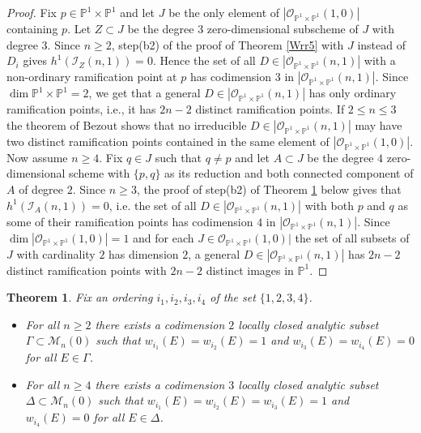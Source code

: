 \documentclass[
  a4paper, 
  reqno, 
  oneside, 
  11pt
]{amsart}
\theoremstyle{plain}	%
\newtheorem{theorem}{Theorem} %
\theoremstyle{mydef} %
\theoremstyle{remark}
\theoremstyle{definition}
\theoremstyle{remark}
\begin{document}
\begin{proof}
Fix $p\in \mathbb P^1\times \mathbb P^1$ and let $J$ be the only element of  $|\mathcal O_{\mathbb P^1\times \mathbb P^1}(1,0)|$ containing $p$. Let $Z\subset J$ be the degree $3$ zero-dimensional subscheme of $J$ with degree $3$. Since $n\ge 2$,  step(b2) of the proof of Theorem \ref{Wrr5} with $J$ instead of $D_i$ gives $h^1(\mathcal I_Z(n,1)) =0$. Hence the set of all $D\in |\mathcal O_{\mathbb P^1\times \mathbb P^1}(n,1)|$ with a non-ordinary ramification point at $p$ has codimension $3$ in $|\mathcal O_{\mathbb P^1\times \mathbb P^1}(n,1)|$. Since $\dim \mathbb P^1\times \mathbb P^1 =2$, we get that a general $D\in |\mathcal O_{\mathbb P^1\times \mathbb P^1}(n,1)|$  has only ordinary ramification points, i.e., it has $2n-2$ distinct ramification points. If $2\le n\le 3$ the theorem of Bezout shows that no irreducible $D\in |\mathcal O_{\mathbb P^1\times \mathbb P^1}(n,1)|$ may have two distinct ramification points contained in the same element of  $|\mathcal O_{\mathbb P^1\times \mathbb P^1}(1,0)|$. Now assume $n\ge 4$. Fix $q\in J$ such that $q\ne p$ and let $A\subset J$ be the degree $4$ zero-dimensional scheme with $\{p,q\}$ as its reduction and both connected component of $A$ of degree $2$. Since $n\ge 3$,
the proof of step(b2) of Theorem \ref{Wrr7} below gives that $h^1(\mathcal I_A(n,1)) =0$, i.e. the set of all  $D\in |\mathcal O_{\mathbb P^1\times \mathbb P^1}(n,1)|$ with both $p$ and $q$ as some of their ramification points has codimension $4$ in  $|\mathcal O_{\mathbb P^1\times \mathbb P^1}(n,1)|$. Since $\dim|\mathcal O_{\mathbb P^1\times \mathbb P^1}(1,0)|=1$ and for each $J\in \mathcal O_{\mathbb P^1\times \mathbb P^1}(1,0)|$ the set of all subsets of $J$ with cardinality $2$ has dimension $2$, a general $D\in |\mathcal O_{\mathbb P^1\times \mathbb P^1}(n,1)|$ has $2n-2$
distinct ramification points with $2n-2$ distinct images in $\mathbb P^1$.
\end{proof}


\begin{theorem}\label{Wrr7}
Fix an ordering $i_1,i_2,i_3,i_4$ of the set $\{1,2,3,4\}$.
\begin{itemize}
\item[(a)] For all $n\ge 2$ there exists  a codimension $2$ locally closed analytic subset $\Gamma \subset \mathcal M_n(0)$ such that $w_{i_1}(E)=w_{i_2}(E)=1$ and $w_{i_3}(E)=w_{i_4}(E)=0$ for all $E\in \Gamma$.

\item[(b)] For all $n\ge 4$ there exists  a codimension $3$ locally closed analytic subset $\Delta \subset \mathcal M_n(0)$ such that $w_{i_1}(E)=w_{i_2}(E)=w_{i_3}(E)=1$ and $w_{i_4}(E)=0$ for all $E\in \Delta$.
\end{itemize}
\end{theorem}
\end{document}
